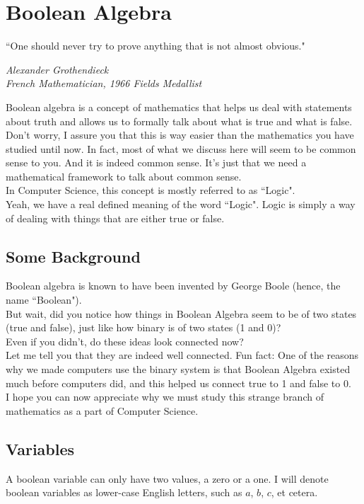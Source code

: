 \documentclass[letterpaper, 12pt]{book}
\begin{document}
\chapter{Boolean Algebra}
\epigraph{\centering ``One should never try to prove anything that is not almost obvious."}{\textit{Alexander Grothendieck \\ French Mathematician, 1966 Fields Medallist}}
Boolean algebra is a concept of mathematics that helps us deal with statements about truth and allows us to formally talk about what is true and what is false.\\
Don't worry, I assure you that this is way easier than the mathematics you have studied until now. In fact, most of what we discuss here will seem to be common sense to you. And it is indeed common sense. It's just that we need a mathematical framework to talk about common sense.\\
In Computer Science, this concept is mostly referred to as ``Logic".\\
Yeah, we have a real defined meaning of the word ``Logic". Logic is simply a way of dealing with things that are either true or false.\\
\section{Some Background}
Boolean algebra is known to have been invented by George Boole (hence, the name ``Boolean").\\
But wait, did you notice how things in Boolean Algebra seem to be of two states (true and false), just like how binary is of two states (1 and 0)?\\
Even if you didn't, do these ideas look connected now?\\
Let me tell you that they are indeed well connected. Fun fact: One of the reasons why we made computers use the binary system is that Boolean Algebra existed much before computers did, and this helped us connect true to 1 and false to 0.\\
I hope you can now appreciate why we must study this strange branch of mathematics as a part of Computer Science.
\section{Variables}
A boolean variable can only have two values, a zero or a one. I will denote boolean variables as lower-case English letters, such as $a$, $b$, $c$, et cetera.
\end{document}
